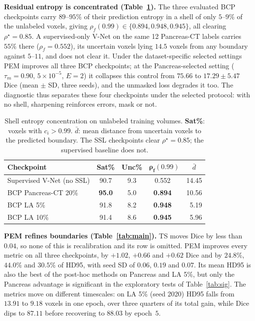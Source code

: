 \documentclass[conference]{IEEEtran}
\newcommand{\cmark}{{\color{green!60!black}\ding{51}}}
\newcommand{\xmark}{{\color{red}\ding{55}}}
\begin{document}
\noindent\textbf{Residual entropy is concentrated (Table~\ref{tab:entropy}).}
The three evaluated BCP checkpoints carry $89$--$95\%$ of their prediction entropy in a shell of only $5$--$9\%$ of the unlabeled voxels, giving $\rho_f(0.99)\in\{0.894,0.948,0.945\}$, all clearing $\rho^\star=0.85$. A supervised-only V-Net on the same 12 Pancreas-CT labels carries $55\%$ there ($\rho_f=0.552$), its uncertain voxels lying $14.5$ voxels from any boundary against $5$--$11$, and does not clear it. Under the dataset-specific selected settings PEM improves all three BCP checkpoints; at the Pancreas-selected setting ($\tau_m=0.90$, $5\times10^{-5}$, $E=2$) it collapses this control from $75.66$ to $17.29\pm5.47$ Dice (mean $\pm$ SD, three seeds), and the unmasked loss degrades it too. The diagnostic thus separates these four checkpoints under the selected protocol: with no shell, sharpening reinforces errors, mask or not.

\begin{table}[tb]
\centering
\caption{Shell entropy concentration on unlabeled training volumes. \textbf{Sat\%}: voxels with $c_i>0.99$. $\bar d$: mean distance from uncertain voxels to the predicted boundary. The SSL checkpoints clear $\rho^\star{=}0.85$; the supervised baseline does not.}
\label{tab:entropy}
\scriptsize
\setlength{\tabcolsep}{4pt}
\begin{tabular}{lcccc}
\toprule
\textbf{Checkpoint} & \textbf{Sat\%} & \textbf{Unc\%} & $\boldsymbol{\rho_f(0.99)}$ & $\bar d$ \\
\midrule
Supervised V-Net (no SSL)   & 90.7 & 9.3 & 0.552~\xmark & 14.45 \\
BCP Pancreas-CT 20\%        & \textbf{95.0} & 5.0 & \textbf{0.894}~\cmark & 10.56 \\
BCP LA 5\%                  & 91.8 & 8.2 & \textbf{0.948}~\cmark & ~5.19 \\
BCP LA 10\%                 & 91.4 & 8.6 & \textbf{0.945}~\cmark & ~5.96 \\
\bottomrule
\end{tabular}
\end{table}

\noindent\textbf{PEM refines boundaries (Table~\ref{tab:main}).}
TS moves Dice by less than $0.04$, so none of this is recalibration and its row is omitted. PEM improves every metric on all three checkpoints, by $+1.02$, $+0.66$ and $+0.62$ Dice and by $24.8\%$, $44.0\%$ and $30.5\%$ of HD95, with seed SD of $0.06$, $0.19$ and $0.07$. Its mean HD95 is also the best of the post-hoc methods on Pancreas and LA 5\%, but only the Pancreas advantage is significant in the exploratory tests of Table~\ref{tab:sig}. The metrics move on different timescales: on LA 5\% (seed 2020) HD95 falls from $13.91$ to $9.18$ voxels in one epoch, over three quarters of its total gain, while Dice dips to $87.11$ before recovering to $88.03$ by epoch~$5$.
\end{document}
